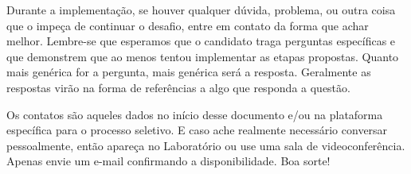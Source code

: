 \documentclass{article}
\begin{document}
Durante a implementação, se houver qualquer dúvida, problema, ou outra coisa
que o impeça de continuar o desafio, entre em contato da forma que achar
melhor. Lembre-se que esperamos que o candidato traga perguntas específicas e
que demonstrem que ao menos tentou implementar as etapas propostas. Quanto mais
genérica for a pergunta, mais genérica será a resposta. Geralmente as respostas
virão na forma de referências a algo que responda a questão.

Os contatos são aqueles dados no início desse documento e/ou na plataforma
específica para o processo seletivo. E caso ache realmente necessário conversar
pessoalmente, então apareça no Laboratório ou use uma sala de
videoconferência. Apenas envie um e-mail confirmando a disponibilidade. Boa
sorte!



\end{document}
